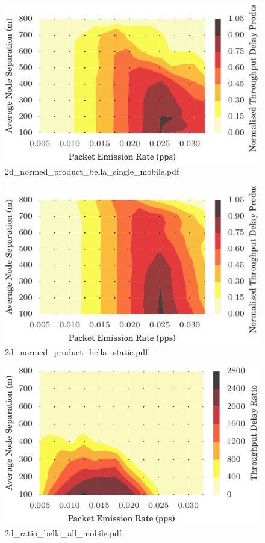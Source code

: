 \documentclass{article}
\begin{document}
\begin{figure}[h!]
\centering
\includegraphics[width=\linewidth]{2d_normed_product_bella_single_mobile.pdf}
\caption{2d\_normed\_product\_bella\_single\_mobile.pdf}
\end{figure}




\begin{figure}[h!]
\centering
\includegraphics[width=\linewidth]{2d_normed_product_bella_static.pdf}
\caption{2d\_normed\_product\_bella\_static.pdf}
\end{figure}




\begin{figure}[h!]
\centering
\includegraphics[width=\linewidth]{2d_ratio_bella_all_mobile.pdf}
\caption{2d\_ratio\_bella\_all\_mobile.pdf}
\end{figure}
\end{document}

